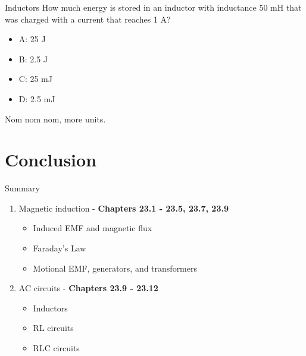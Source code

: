 \documentclass{beamer}
\begin{document}
\begin{frame}{Inductors}
How much energy is stored in an inductor with inductance 50 mH that was charged with a current that reaches 1 A?
\begin{itemize}
\item A: 25 J
\item B: 2.5 J
\item C: 25 mJ 
\item D: 2.5 mJ
\end{itemize}
\footnotesize
Nom nom nom, more units.
\end{frame}

\section{Conclusion}

\begin{frame}{Summary}
\begin{enumerate}
\item Magnetic induction - \textbf{Chapters 23.1 - 23.5, 23.7, 23.9}
\begin{itemize}
\item Induced EMF and magnetic flux
\item Faraday's Law
\item Motional EMF, generators, and transformers
\end{itemize}
\item AC circuits - \textbf{Chapters 23.9 - 23.12}
\begin{itemize}
\item Inductors
\item RL circuits
\item RLC circuits
\end{itemize}
\end{enumerate}
\end{frame}
\end{document}
